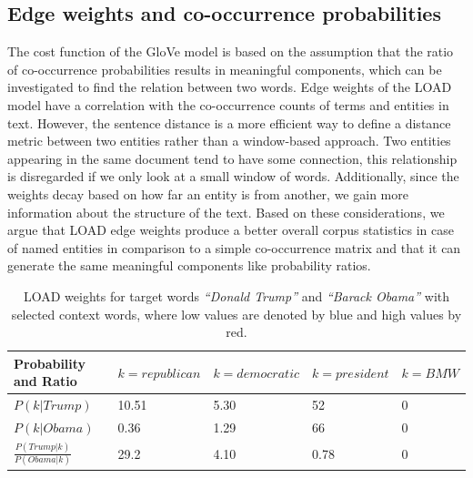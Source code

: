 \subsection{Edge weights and co-occurrence probabilities}\label{subsec:weights_load}
The cost function of the GloVe model is based on the assumption that the ratio of co-occurrence probabilities results in meaningful components, which can be investigated to find the relation between two words. Edge weights of the LOAD model have a correlation with the co-occurrence counts of terms and entities in text. However, the sentence distance is a more efficient way to define a distance metric between two entities rather than a window-based approach. Two entities appearing in the same document tend to have some connection, this relationship is disregarded if we only look at a small window of words. Additionally, since the weights decay based on how far an entity is from another, we gain more information about the structure of the text. Based on these considerations, we argue that LOAD edge weights produce a better overall corpus statistics in case of named entities in comparison to a simple co-occurrence matrix and that it can generate the same meaningful components like probability ratios. \\
\begin{table}[]
\centering
\caption{LOAD weights for target words \emph{``Donald Trump''} and \emph{``Barack Obama''} with selected context words, where low values are denoted by blue and high values by red. }
\label{table:tab_2}
\begin{tabular}{@{}l|l|l|l|l@{}}

\toprule
Probability and Ratio&  $k=republican$& $k=democratic$ & $k=president$ &$k= BMW$  \\ \midrule
 $P(k|Trump)$& {\color[HTML]{CB0000}10.51} &  {\color[HTML]{329A9D}5.30} & {\color[HTML]{CB0000}52} & {\color[HTML]{329A9D}0} \\\midrule
  $P(k|Obama)$&{\color[HTML]{329A9D}0.36}  & {\color[HTML]{CB0000}1.29} &  {\color[HTML]{CB0000}66}&{\color[HTML]{329A9D}0}  \\\midrule
 $\frac { P(Trump|k) }{ P(Obama|k) } $& {\color[HTML]{CB0000}29.2} &  {\color[HTML]{329A9D}4.10}&  0.78 &    0  \\\midrule
\end{tabular}%


\end{table}
\label{sec:components_load}
